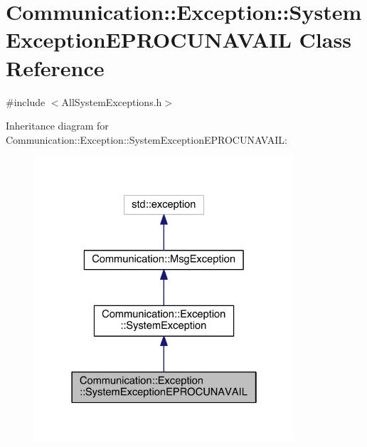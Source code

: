 \hypertarget{class_communication_1_1_exception_1_1_system_exception_e_p_r_o_c_u_n_a_v_a_i_l}{}\section{Communication\+:\+:Exception\+:\+:System\+Exception\+E\+P\+R\+O\+C\+U\+N\+A\+V\+A\+I\+L Class Reference}
\label{class_communication_1_1_exception_1_1_system_exception_e_p_r_o_c_u_n_a_v_a_i_l}


{\ttfamily \#include $<$All\+System\+Exceptions.\+h$>$}



Inheritance diagram for Communication\+:\+:Exception\+:\+:System\+Exception\+E\+P\+R\+O\+C\+U\+N\+A\+V\+A\+I\+L\+:\nopagebreak
\begin{figure}[H]
\begin{center}
\leavevmode
\includegraphics[width=274pt]{class_communication_1_1_exception_1_1_system_exception_e_p_r_o_c_u_n_a_v_a_i_l__inherit__graph}
\end{center}
\end{figure}


